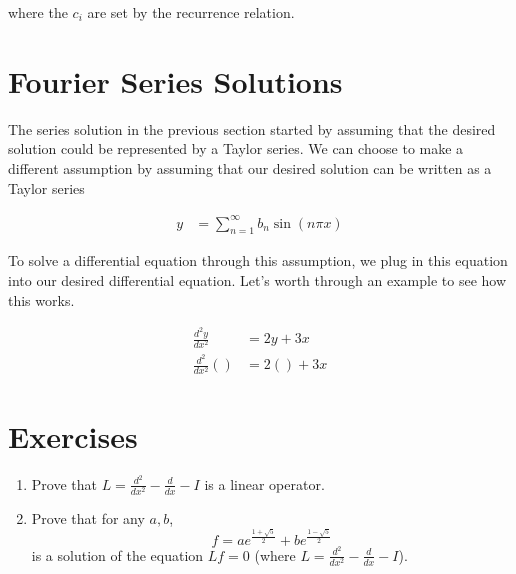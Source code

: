 \documentclass[book.tex]{subfiles}
\begin{document}
where the $c_i$ are set by the recurrence relation.

\section{Fourier Series Solutions}

The series solution in the previous section started by assuming that the desired solution could be represented by a Taylor series. We can choose to make a different assumption by assuming that our desired solution can be written as a Taylor series

\begin{align}
    y &= \sum_{n=1}^\infty b_n \sin (n \pi x)
\end{align}

To solve a differential equation through this assumption, we plug in this equation into our desired differential equation. Let's worth through an example to see how this works.

\begin{align}
    \frac{d^2 y}{d x^2} &= 2y + 3x \\
    \frac{d^2}{dx^2} \left ( \right ) &= 2 \left ( \right ) + 3 x
\end{align}


 
\section{Exercises}
\begin{enumerate}
    \item Prove that $L = \frac{d^2}{dx^2} - \frac{d}{dx} - I$ is a linear operator.
    \item Prove that for any $a, b$, 
    \[ f = ae^{\frac{1 + \sqrt{5}}{2}} + b e^{\frac{1 - \sqrt{5}}{2}} \]
    is a solution of the equation $L f = 0$ (where $L = \frac{d^2}{dx^2} - \frac{d}{dx} - I$).
\end{enumerate}
\end{document}
